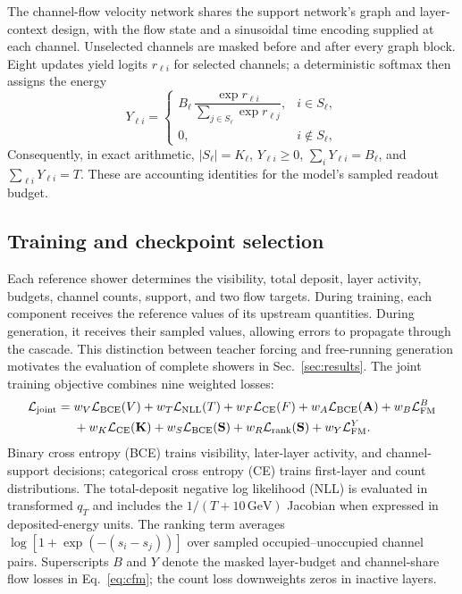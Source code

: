 \documentclass[11pt]{article}
\newcommand{\GeV}{\,\mathrm{GeV}}
\begin{document}
The channel-flow velocity network shares the support network's graph and layer-context design, with the flow state and a sinusoidal time encoding supplied at each channel. Unselected channels are masked before and after every graph block. Eight updates yield logits $r_{\ell i}$ for selected channels; a deterministic softmax then assigns the energy
\begin{equation}
 Y_{\ell i}=
 \begin{cases}
 B_\ell\,\dfrac{\exp r_{\ell i}}{\sum_{j\in S_\ell}\exp r_{\ell j}}, & i\in S_\ell,\\[6pt]
 0, & i\notin S_\ell,
 \end{cases}
 \label{eq:decoder}
\end{equation}
Consequently, in exact arithmetic, $|S_\ell|=K_\ell$, $Y_{\ell i}\geq0$, $\sum_iY_{\ell i}=B_\ell$, and $\sum_{\ell i}Y_{\ell i}=T$. These are accounting identities for the model's sampled readout budget.

\subsection{Training and checkpoint selection}

Each reference shower determines the visibility, total deposit, layer activity, budgets, channel counts, support, and two flow targets. During training, each component receives the reference values of its upstream quantities. During generation, it receives their sampled values, allowing errors to propagate through the cascade. This distinction between teacher forcing and free-running generation motivates the evaluation of complete showers in Sec.~\ref{sec:results}. The joint training objective combines nine weighted losses:
\begin{equation}
 \begin{aligned}
 \mathcal L_{\rm joint}={}&w_V\mathcal L_{\rm BCE}(V)
 +w_T\mathcal L_{\rm NLL}(T)
 +w_F\mathcal L_{\rm CE}(F)
 +w_A\mathcal L_{\rm BCE}(\mathbf A)
 +w_B\mathcal L_{\rm FM}^{B}\\
 &+w_K\mathcal L_{\rm CE}(\mathbf K)
 +w_S\mathcal L_{\rm BCE}(\mathbf S)
 +w_R\mathcal L_{\rm rank}(\mathbf S)
 +w_Y\mathcal L_{\rm FM}^{Y}.
 \end{aligned}
 \label{eq:joint_loss}
\end{equation}
Binary cross entropy (BCE) trains visibility, later-layer activity, and channel-support decisions; categorical cross entropy (CE) trains first-layer and count distributions. The total-deposit negative log likelihood (NLL) is evaluated in transformed $q_T$ and includes the $1/(T+10\GeV)$ Jacobian when expressed in deposited-energy units. The ranking term averages $\log[1+\exp(-(s_i-s_j))]$ over sampled occupied--unoccupied channel pairs. Superscripts $B$ and $Y$ denote the masked layer-budget and channel-share flow losses in Eq.~\eqref{eq:cfm}; the count loss downweights zeros in inactive layers.
\end{document}

